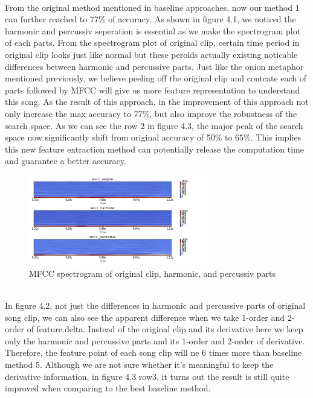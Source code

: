 \documentclass[final]{siamltexmm}
\begin{document}
\\From the original method mentioned in baseline approaches, now our method 1 can further reached to 77\% of accuracy. As shown in figure 4.1, we noticed the harmonic and percussiv seperation is essential as we make the spectrogram plot of each parts. From the spectrogram plot of original clip, certain time period in original clip looks just like normal but these peroids actually existing noticable differences between harmonic and percussive parts. Just like the onion metaphor mentioned previously, we believe peeling off the original clip and contcate each of parts followed by MFCC will give us more feature representation to understand this song. As the result of this approach, in the improvement of this approach not only increase the max accuracy to 77\%, but also improve the robustness of the search space. As we can see the row 2 in figure 4.3, the major peak of the search space now significantly shift from original accuracy of 50\% to 65\%. This implies this new feature extraction method can potentially release the computation time and guarantee a better accuracy.

\begin{figure}[!ht]
  \centering
    \includegraphics[width=0.7\textwidth]{../fig/harmonic_percussiv_mfcc_nolog.png}
  \caption{MFCC spectrogram of original clip, harmonic, and percussiv parts}
\end{figure}

\\In figure 4.2, not just the differences in harmonic and percussive parts of original song clip, we can also see the apparent difference when we take 1-order and 2-order of feature.delta. Instead of the original clip and its derivative here we keep only the harmonic and percussive parts and its 1-order and 2-order of derivative. Therefore, the feature point of each song clip will ne 6 times more than baseline method 5. Although we are not sure whether it's meaningful to keep the derivative information, in figure 4.3 row3, it turns out the result is still quite improved when comparing to the best baseline method.
\end{document}
